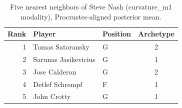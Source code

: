 \begin{table}[htbp]
  \centering\small
  \begin{tabular}{rllc}
    \toprule
    Rank & Player & Position & Archetype \\
    \midrule
    1 & Tomas Satoransky & G & 2 \\
    2 & Sarunas Jasikevicius & G & 1 \\
    3 & Jose Calderon & G & 2 \\
    4 & Detlef Schrempf & F & 1 \\
    5 & John Crotty & G & 1 \\
    \bottomrule
  \end{tabular}
  \caption{Five nearest neighbors of Steve Nash (curvature_m1 modality), Procrustes-aligned posterior mean.}
  \label{tab:Steve_Nash_neighbors_curvature_m1}
\end{table}

